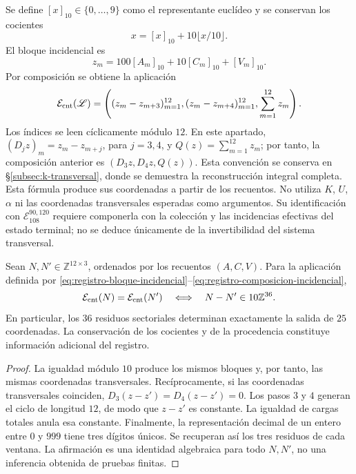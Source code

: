 Se define \([x]_{10}\in\{0,\ldots,9\}\) como el representante
euclídeo y se conservan los cocientes
\[
 x=[x]_{10}+10\lfloor x/10\rfloor.
\]
El bloque incidencial es
\begin{equation}
 z_m=100[A_m]_{10}+10[C_m]_{10}+[V_m]_{10}.
 \label{eq:registro-bloque-incidencial}
\end{equation}
Por composición se obtiene la aplicación
\begin{equation}
 \mathcal E_{\rm cnt}(\mathscr L)=
 \left((z_m-z_{m+3})_{m=1}^{12},
       (z_m-z_{m+4})_{m=1}^{12},\sum_{m=1}^{12}z_m\right).
\label{eq:registro-composicion-incidencial}
\end{equation}
Los índices se leen cíclicamente módulo \(12\). En este apartado,
\((D_jz)_m=z_m-z_{m+j}\), para \(j=3,4\), y
\(Q(z)=\sum_{m=1}^{12}z_m\); por tanto, la composición anterior es
\((D_3z,D_4z,Q(z))\). Esta convención se conserva en
\S\ref{subsec:k-transversal}, donde se demuestra la reconstrucción
integral completa.
Esta fórmula produce sus coordenadas a partir de los recuentos. No utiliza
\(K\), \(U\), \(\alpha\) ni las coordenadas transversales esperadas
como argumentos. Su identificación con
\(\mathcal E_{108}^{90,120}\) requiere componerla con la colección y
las incidencias efectivas del estado terminal; no se deduce únicamente
de la invertibilidad del sistema transversal.

\begin{proposition}
\label{prop:registro-36-residuos}
Sean \(N,N'\in\mathbb Z^{12\times3}\), ordenados por los recuentos
\((A,C,V)\). Para la aplicación definida por
\eqref{eq:registro-bloque-incidencial}--\eqref{eq:registro-composicion-incidencial},
\[
 \mathcal E_{\rm cnt}(N)=\mathcal E_{\rm cnt}(N')
 \quad\Longleftrightarrow\quad
 N-N'\in10\mathbb Z^{36}.
\]
En particular, los \(36\) residuos sectoriales determinan exactamente
la salida de \(25\) coordenadas. La conservación de los cocientes y
de la procedencia constituye información adicional del registro.
\end{proposition}

\begin{proof}
La igualdad módulo \(10\) produce los mismos bloques y, por tanto,
las mismas coordenadas transversales. Recíprocamente, si las coordenadas
transversales coinciden, \(D_3(z-z')=D_4(z-z')=0\). Los pasos
\(3\) y \(4\) generan el ciclo de longitud \(12\), de modo que
\(z-z'\) es constante. La igualdad de cargas totales anula esa
constante. Finalmente, la representación decimal de un entero entre
\(0\) y \(999\) tiene tres dígitos únicos. Se recuperan así los
tres residuos de cada ventana. La afirmación es una identidad algebraica
para todo \(N,N'\), no una inferencia obtenida de pruebas finitas.
\end{proof}

